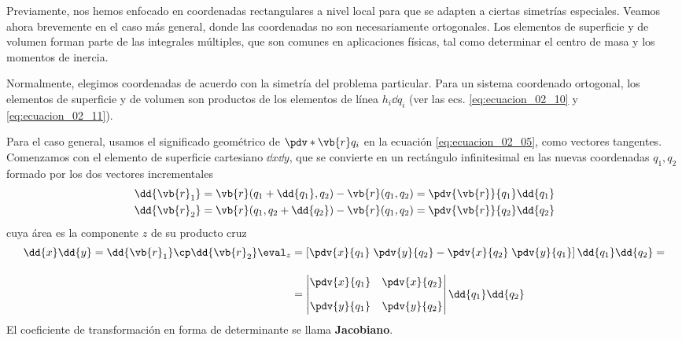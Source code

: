 Previamente, nos hemos enfocado en coordenadas rectangulares a nivel local para que se adapten a ciertas simetrías especiales. Veamos ahora brevemente en el caso más general, donde las coordenadas no son necesariamente ortogonales. Los elementos de superficie y de volumen forman parte de las integrales múltiples, que son comunes en aplicaciones físicas, tal como determinar el centro de masa y los momentos de inercia.
\par
Normalmente, elegimos coordenadas de acuerdo con la simetría del problema particular. Para un sistema coordenado ortogonal, los elementos de superficie y de volumen son productos de los elementos de línea $h_{i} \dd{q_{i}}$ (ver las ecs. \ref{eq:ecuacion_02_10} y \ref{eq:ecuacion_02_11}).
\par
Para el caso general, usamos el significado geométrico de $\pdv*{\vb{r}}{q_{i}}$ en la ecuación \ref{eq:ecuacion_02_05}, como vectores tangentes. Comenzamos con el elemento de superficie cartesiano $\dd{x} \dd{y}$, que se convierte en un rectángulo infinitesimal en las nuevas coordenadas $q_{1}, q_{2}$  formado por los dos vectores incrementales
\begin{align}
\begin{aligned}
\dd{\vb{r}_{1}} &= \vb{r} (q_{1} + \dd{q_{1}}, q_{2}) - \vb{r}(q_{1}, q_{2}) = \pdv{\vb{r}}{q_{1}} \dd{q_{1}} \\
\dd{\vb{r}_{2}} &= \vb{r} (q_{1}, q_{2} + \dd{q_{2}}) - \vb{r}(q_{1}, q_{2}) = \pdv{\vb{r}}{q_{2}} \dd{q_{2}}
\end{aligned}
\label{eq:ecuacion_02_14}
\end{align}
cuya área es la componente $z$ de su producto cruz
\begin{align}
\begin{aligned}
\dd{x} \dd{y} =\dd{\vb{r}_{1}} \cp \dd{\vb{r}_{2}} \eval_{z} &= \left[ \pdv{x}{q_{1}} \; \pdv{y}{q_{2}} - \pdv{x}{q_{2}} \; \pdv{y}{q_{1}} \right] \dd{q_{1}} \dd{q_{2}} = \\[1em]
&= \begin{vmatrix}
\displaystyle \pdv{x}{q_{1}} & \displaystyle \pdv{x}{q_{2}} \\[1em]
\displaystyle \pdv{y}{q_{1}} & \displaystyle \pdv{y}{q_{2}} 
\end{vmatrix} \dd{q_{1}} \dd{q_{2}}
\end{aligned}
\label{eq:ecuacion_02_15}
\end{align}
El coeficiente de transformación en forma de determinante se llama \textbf{Jacobiano}.
\par
